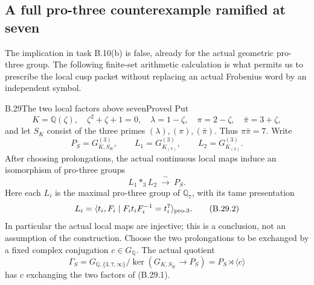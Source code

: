 \subsection{A full pro-three counterexample ramified at seven}

The implication in task B.10(b) is false, already for the actual
geometric pro-three group.  The following finite-set arithmetic
calculation is what permits us to prescribe the local cusp packet
without replacing an actual Frobenius word by an independent symbol.

\begin{statement}{B.29}{The two local factors above seven}{Proved}
Put
\[
 K=\mathbb Q(\zeta),\quad \zeta^2+\zeta+1=0,\quad
 \lambda=1-\zeta,\quad \pi=2-\zeta,\quad
 \bar\pi=3+\zeta,
\]
and let $S_K$ consist of the three primes
$(\lambda),(\pi),(\bar\pi)$.  Thus $\pi\bar\pi=7$.
Write
\[
 P_S=G_{K,S_K}^{(3)},\qquad
 L_1=G_{K_{(\pi)}}^{(3)},\qquad
 L_2=G_{K_{(\bar\pi)}}^{(3)}.
\]
After choosing prolongations, the actual continuous local maps
induce an isomorphism of pro-three groups
\[
             L_1*_3 L_2\ \xrightarrow{\ \sim\ }\ P_S.       \tag{B.29.1}
\]
Here each $L_i$ is the maximal pro-three group of $\mathbb Q_7$,
with its tame presentation
\[
 L_i=\langle t_i,F_i\mid F_it_iF_i^{-1}=t_i^7\rangle_{\rm pro\text{-}3}.
                                                               \tag{B.29.2}
\]
In particular the actual local maps are injective; this is a
conclusion, not an assumption of the construction.
Choose the two prolongations to be exchanged by a fixed complex
conjugation $c\in G_{\mathbb Q}$.  The actual quotient
\[
 \Gamma_S=
 G_{\mathbb Q,\{3,7,\infty\}}/
 \ker(G_{K,S_K}\longrightarrow P_S)
       =P_S\rtimes\langle c\rangle                             \tag{B.29.3}
\]
has $c$ exchanging the two factors of (B.29.1).
\end{statement}
